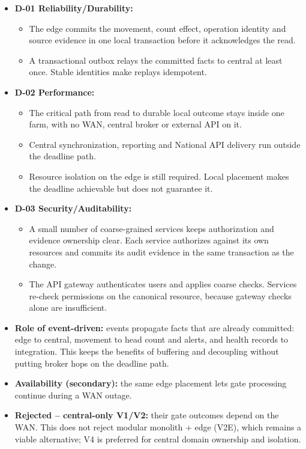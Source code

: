 \begin{itemize}
  \item \textbf{D-01 Reliability/Durability:}
  \begin{itemize}
    \item The edge commits the movement, count effect, operation identity and source evidence in one local transaction before it acknowledges the read.
    \item A transactional outbox relays the committed facts to central at least once. Stable identities make replays idempotent.
  \end{itemize}
  \item \textbf{D-02 Performance:}
  \begin{itemize}
    \item The critical path from read to durable local outcome stays inside one farm, with no WAN, central broker or external API on it.
    \item Central synchronization, reporting and National API delivery run outside the deadline path.
    \item Resource isolation on the edge is still required. Local placement makes the deadline achievable but does not guarantee it.
  \end{itemize}
  \item \textbf{D-03 Security/Auditability:}
  \begin{itemize}
    \item A small number of coarse-grained services keeps authorization and evidence ownership clear. Each service authorizes against its own resources and commits its audit evidence in the same transaction as the change.
    \item The API gateway authenticates users and applies coarse checks. Services re-check permissions on the canonical resource, because gateway checks alone are insufficient.
  \end{itemize}
  \item \textbf{Role of event-driven:} events propagate facts that are already committed: edge to central, movement to head count and alerts, and health records to integration. This keeps the benefits of buffering and decoupling without putting broker hops on the deadline path.
  \item \textbf{Availability (secondary):} the same edge placement lets gate processing continue during a WAN outage.
  \item \textbf{Rejected -- central-only V1/V2:} their gate outcomes depend on the WAN. This does not reject modular monolith + edge (V2E), which remains a viable alternative; V4 is preferred for central domain ownership and isolation.

\end{itemize}
